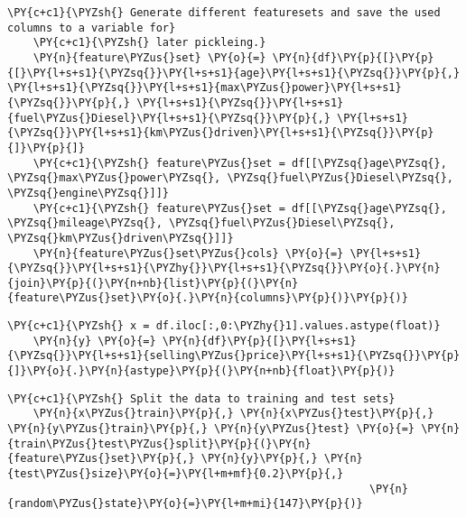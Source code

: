         \begin{tcolorbox}[breakable, size=fbox, boxrule=1pt, pad at break*=1mm,colback=cellbackground, colframe=cellborder]
    \begin{Verbatim}[commandchars=\\\{\}]
    \PY{c+c1}{\PYZsh{} Generate different featuresets and save the used columns to a variable for}
    \PY{c+c1}{\PYZsh{} later pickleing.}
    \PY{n}{feature\PYZus{}set} \PY{o}{=} \PY{n}{df}\PY{p}{[}\PY{p}{[}\PY{l+s+s1}{\PYZsq{}}\PY{l+s+s1}{age}\PY{l+s+s1}{\PYZsq{}}\PY{p}{,} \PY{l+s+s1}{\PYZsq{}}\PY{l+s+s1}{max\PYZus{}power}\PY{l+s+s1}{\PYZsq{}}\PY{p}{,} \PY{l+s+s1}{\PYZsq{}}\PY{l+s+s1}{fuel\PYZus{}Diesel}\PY{l+s+s1}{\PYZsq{}}\PY{p}{,} \PY{l+s+s1}{\PYZsq{}}\PY{l+s+s1}{km\PYZus{}driven}\PY{l+s+s1}{\PYZsq{}}\PY{p}{]}\PY{p}{]}
    \PY{c+c1}{\PYZsh{} feature\PYZus{}set = df[[\PYZsq{}age\PYZsq{}, \PYZsq{}max\PYZus{}power\PYZsq{}, \PYZsq{}fuel\PYZus{}Diesel\PYZsq{}, \PYZsq{}engine\PYZsq{}]]}
    \PY{c+c1}{\PYZsh{} feature\PYZus{}set = df[[\PYZsq{}age\PYZsq{}, \PYZsq{}mileage\PYZsq{}, \PYZsq{}fuel\PYZus{}Diesel\PYZsq{}, \PYZsq{}km\PYZus{}driven\PYZsq{}]]}
    \PY{n}{feature\PYZus{}set\PYZus{}cols} \PY{o}{=} \PY{l+s+s1}{\PYZsq{}}\PY{l+s+s1}{\PYZhy{}}\PY{l+s+s1}{\PYZsq{}}\PY{o}{.}\PY{n}{join}\PY{p}{(}\PY{n+nb}{list}\PY{p}{(}\PY{n}{feature\PYZus{}set}\PY{o}{.}\PY{n}{columns}\PY{p}{)}\PY{p}{)}
    \end{Verbatim}
    \end{tcolorbox}
    

        \begin{tcolorbox}[breakable, size=fbox, boxrule=1pt, pad at break*=1mm,colback=cellbackground, colframe=cellborder]
    \begin{Verbatim}[commandchars=\\\{\}]
    \PY{c+c1}{\PYZsh{} x = df.iloc[:,0:\PYZhy{}1].values.astype(float)}
    \PY{n}{y} \PY{o}{=} \PY{n}{df}\PY{p}{[}\PY{l+s+s1}{\PYZsq{}}\PY{l+s+s1}{selling\PYZus{}price}\PY{l+s+s1}{\PYZsq{}}\PY{p}{]}\PY{o}{.}\PY{n}{astype}\PY{p}{(}\PY{n+nb}{float}\PY{p}{)}
    \end{Verbatim}
    \end{tcolorbox}
    
        \begin{tcolorbox}[breakable, size=fbox, boxrule=1pt, pad at break*=1mm,colback=cellbackground, colframe=cellborder]
    \begin{Verbatim}[commandchars=\\\{\}]
    \PY{c+c1}{\PYZsh{} Split the data to training and test sets}
    \PY{n}{x\PYZus{}train}\PY{p}{,} \PY{n}{x\PYZus{}test}\PY{p}{,} \PY{n}{y\PYZus{}train}\PY{p}{,} \PY{n}{y\PYZus{}test} \PY{o}{=} \PY{n}{train\PYZus{}test\PYZus{}split}\PY{p}{(}\PY{n}{feature\PYZus{}set}\PY{p}{,} \PY{n}{y}\PY{p}{,} \PY{n}{test\PYZus{}size}\PY{o}{=}\PY{l+m+mf}{0.2}\PY{p}{,}
                                                        \PY{n}{random\PYZus{}state}\PY{o}{=}\PY{l+m+mi}{147}\PY{p}{)}
    \end{Verbatim}
    \end{tcolorbox}
    

